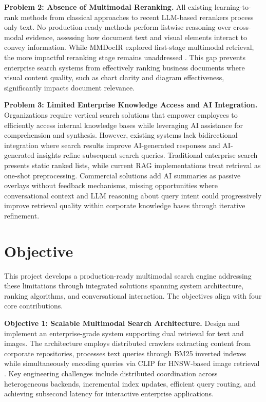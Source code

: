 \textbf{Problem 2: Absence of Multimodal Reranking.} All existing learning-to-rank methods from classical approaches \cite{burges2005learning, cao2007learning} to recent LLM-based rerankers \cite{sun2023chatgpt, pradeep2023rankzephyr} process only text. No production-ready methods perform listwise reasoning over cross-modal evidence, assessing how document text and visual elements interact to convey information. While MMDocIR \cite{dong2025mmdocir} explored first-stage multimodal retrieval, the more impactful reranking stage remains unaddressed \cite{nogueira2019passage}. This gap prevents enterprise search systems from effectively ranking business documents where visual content quality, such as chart clarity and diagram effectiveness, significantly impacts document relevance.

\textbf{Problem 3: Limited Enterprise Knowledge Access and AI Integration.} Organizations require vertical search solutions that empower employees to efficiently access internal knowledge bases while leveraging AI assistance for comprehension and synthesis. However, existing systems lack bidirectional integration where search results improve AI-generated responses and AI-generated insights refine subsequent search queries. Traditional enterprise search presents static ranked lists, while current RAG implementations treat retrieval as one-shot preprocessing. Commercial solutions add AI summaries as passive overlays without feedback mechanisms, missing opportunities where conversational context and LLM reasoning about query intent could progressively improve retrieval quality within corporate knowledge bases through iterative refinement.

\section{Objective}

This project develops a production-ready multimodal search engine addressing these limitations through integrated solutions spanning system architecture, ranking algorithms, and conversational interaction. The objectives align with four core contributions.

\noindent\textbf{Objective 1: Scalable Multimodal Search Architecture.} Design and implement an enterprise-grade system supporting dual retrieval for text and images. The architecture employs distributed crawlers extracting content from corporate repositories, processes text queries through BM25 inverted indexes while simultaneously encoding queries via CLIP for HNSW-based image retrieval \cite{malkov2018efficient}. Key engineering challenges include distributed coordination across heterogeneous backends, incremental index updates, efficient query routing, and achieving subsecond latency for interactive enterprise applications.


